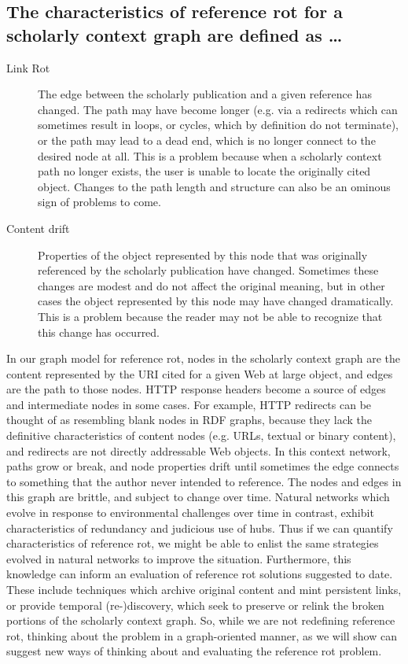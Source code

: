 \documentclass[12pt]{article}
\begin{document}
\subsection{The characteristics of reference rot for a scholarly context graph are defined as …}
\begin{description}
\item[Link Rot]The edge between the scholarly publication and a given reference has changed. The path may have become longer (e.g. via a redirects which can sometimes result in loops, or cycles, which by definition do not terminate), or the path may lead to a dead end, which is no longer connect to the desired node at all. This is a problem because when a scholarly context path no longer exists, the user is unable to locate the originally cited object. Changes to the path length and structure can also be an ominous sign of problems to come.
\item[Content drift]Properties of the object represented by this node that was originally referenced by the scholarly publication have changed. Sometimes these changes are modest and do not affect the original meaning, but in other cases the object represented by this node may have changed dramatically. This is a problem because the reader may not be able to recognize that this change has occurred.
\end{description}
In our graph model for reference rot, nodes in the scholarly context graph are the content represented by the URI cited for a given Web at large object, and edges are the path to those nodes. HTTP response headers become a source of edges and intermediate nodes in some cases. For example, HTTP redirects can be thought of as resembling blank nodes in RDF graphs, because they lack the definitive characteristics of content nodes (e.g. URLs, textual or binary content), and redirects are not directly addressable Web objects. In this context network, paths grow or break, and node properties drift until sometimes the edge connects to something that the author never intended to reference. The nodes and edges in this graph are  brittle, and subject to change over time. Natural networks which evolve in response to environmental challenges over time in contrast, exhibit characteristics of redundancy and judicious use of hubs. Thus if we can quantify characteristics of reference rot, we might be able to enlist the same strategies evolved in natural networks to improve the situation. Furthermore, this knowledge can inform an evaluation of reference rot solutions suggested to date. These include techniques which archive original content and mint persistent links, or provide temporal (re-)discovery, which seek to preserve or relink the broken portions of the scholarly context graph.  So, while we are not redefining reference rot, thinking about the problem in a graph-oriented manner, as we will show can suggest new ways of thinking about and evaluating the reference rot problem.
\end{document}
